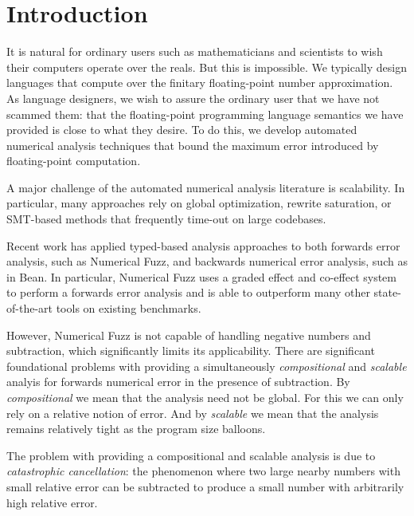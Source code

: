 \section{Introduction}

It is natural for ordinary users such as mathematicians and scientists to wish
their computers operate over the reals. But this is impossible. We typically
design languages that compute over the finitary floating-point number
approximation.
As language designers, we wish to assure the ordinary user that we have not
scammed them: that the floating-point programming language semantics we have
provided is close to what they desire. 
To do this, we develop automated numerical analysis techniques that bound the
maximum error introduced by floating-point computation.


A major challenge of the automated numerical analysis literature is scalability.
In particular, many approaches rely on global optimization, %
rewrite saturation, %
or SMT-based methods %
that frequently time-out on large codebases. 

Recent work has applied typed-based analysis approaches to both forwards error
analysis, such as Numerical Fuzz, and backwards numerical error analysis, such
as in Bean. %
In particular, Numerical Fuzz uses a graded effect and co-effect system to
perform a forwards error analysis and is able to outperform many other
state-of-the-art tools on existing benchmarks.

However, Numerical Fuzz is not capable of handling negative numbers and
subtraction, which significantly limits its applicability.
There are significant foundational problems with providing a simultaneously
\textit{compositional} and \textit{scalable} analyis for forwards numerical
error in the presence of subtraction. By \textit{compositional} we mean that
the analysis need not be global. For this we can only rely on a relative notion
of error. And by \textit{scalable} we mean that the analysis remains relatively
tight as the program size balloons.

The problem with providing a compositional and scalable analysis is due to
\textit{catastrophic cancellation}: the phenomenon where two large nearby
numbers with small relative error can be subtracted to produce a small number
with arbitrarily high relative error. 


